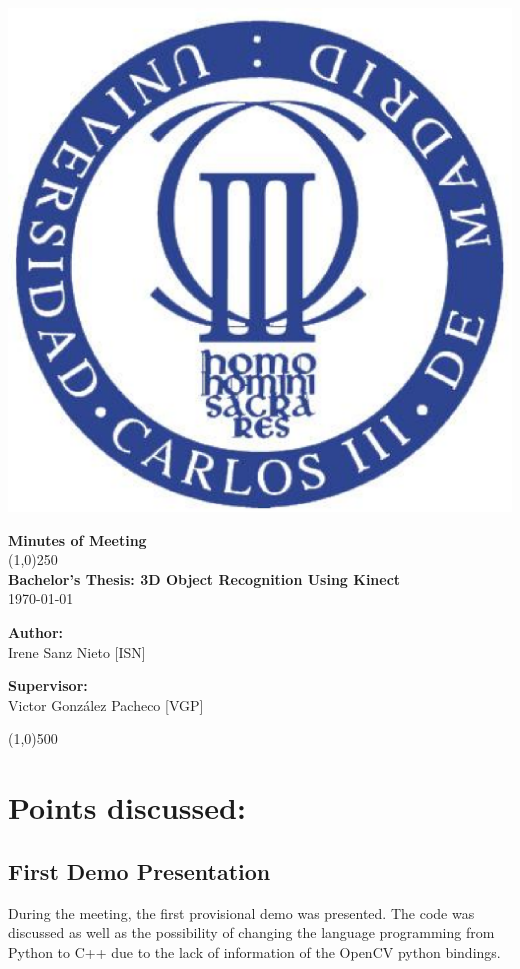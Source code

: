 \documentclass{article}
\newenvironment{myindentpar}[1]%
 {\begin{list}{}%
         {\setlength{\leftmargin}{#1}}%
         \item[]%
 }
 {\end{list}}
\begin{document}
\includegraphics[width=0.1\linewidth]{../template/uc3m.eps}

\vspace{-1cm}
\begin{minipage}[b]{1\linewidth}
	\begin{center}
	{\Huge \bfseries{Minutes of Meeting}}\\
	\line(1,0){250}\\[1cm]
	{\LARGE \textbf{Bachelor's Thesis: 3D Object Recognition Using Kinect}}\\[0.5cm]
	{\large \today}
	\end{center}
\end {minipage}



\begin{minipage}{0.55\textwidth}
\begin{flushleft} \large
\textbf{{Author:}\\}
Irene Sanz Nieto [ISN]\\
\end{flushleft}
\end{minipage}
\begin{minipage}{0.4\textwidth}
\begin{flushright} \large
\textbf{Supervisor: }\\
Victor González Pacheco [VGP]
\end{flushright}\end{minipage}

\begin{center}
\line(1,0){500}
\end{center}

\renewcommand{\thesubsection}
{\hspace*{1cm} \arabic{section}.\arabic{subsection}}



\section{\LARGE Points discussed: }
	\subsection{First Demo Presentation}
	
		\begin{myindentpar}{1cm} 
			During the meeting, the first provisional demo was presented. The code was discussed as well as the possibility of changing the language programming from Python to C++ due to the lack of information of the OpenCV python bindings. 
		\end{myindentpar}
		
\end{document}
